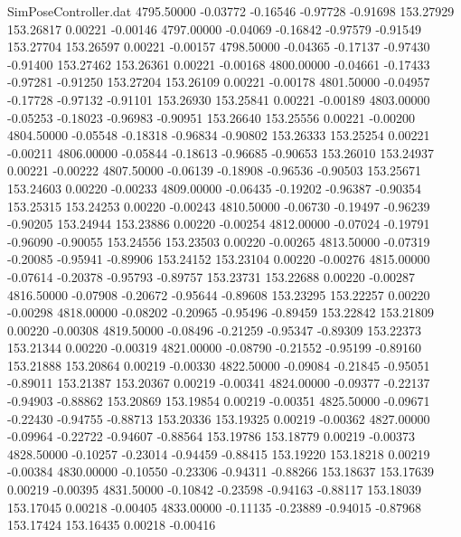 \begin{filecontents}{SimPoseController.dat}
4795.50000   -0.03772   -0.16546    -0.97728   -0.91698  153.27929  153.26817    0.00221   -0.00146
4797.00000   -0.04069   -0.16842    -0.97579   -0.91549  153.27704  153.26597    0.00221   -0.00157
4798.50000   -0.04365   -0.17137    -0.97430   -0.91400  153.27462  153.26361    0.00221   -0.00168
4800.00000   -0.04661   -0.17433    -0.97281   -0.91250  153.27204  153.26109    0.00221   -0.00178
4801.50000   -0.04957   -0.17728    -0.97132   -0.91101  153.26930  153.25841    0.00221   -0.00189
4803.00000   -0.05253   -0.18023    -0.96983   -0.90951  153.26640  153.25556    0.00221   -0.00200
4804.50000   -0.05548   -0.18318    -0.96834   -0.90802  153.26333  153.25254    0.00221   -0.00211
4806.00000   -0.05844   -0.18613    -0.96685   -0.90653  153.26010  153.24937    0.00221   -0.00222
4807.50000   -0.06139   -0.18908    -0.96536   -0.90503  153.25671  153.24603    0.00220   -0.00233
4809.00000   -0.06435   -0.19202    -0.96387   -0.90354  153.25315  153.24253    0.00220   -0.00243
4810.50000   -0.06730   -0.19497    -0.96239   -0.90205  153.24944  153.23886    0.00220   -0.00254
4812.00000   -0.07024   -0.19791    -0.96090   -0.90055  153.24556  153.23503    0.00220   -0.00265
4813.50000   -0.07319   -0.20085    -0.95941   -0.89906  153.24152  153.23104    0.00220   -0.00276
4815.00000   -0.07614   -0.20378    -0.95793   -0.89757  153.23731  153.22688    0.00220   -0.00287
4816.50000   -0.07908   -0.20672    -0.95644   -0.89608  153.23295  153.22257    0.00220   -0.00298
4818.00000   -0.08202   -0.20965    -0.95496   -0.89459  153.22842  153.21809    0.00220   -0.00308
4819.50000   -0.08496   -0.21259    -0.95347   -0.89309  153.22373  153.21344    0.00220   -0.00319
4821.00000   -0.08790   -0.21552    -0.95199   -0.89160  153.21888  153.20864    0.00219   -0.00330
4822.50000   -0.09084   -0.21845    -0.95051   -0.89011  153.21387  153.20367    0.00219   -0.00341
4824.00000   -0.09377   -0.22137    -0.94903   -0.88862  153.20869  153.19854    0.00219   -0.00351
4825.50000   -0.09671   -0.22430    -0.94755   -0.88713  153.20336  153.19325    0.00219   -0.00362
4827.00000   -0.09964   -0.22722    -0.94607   -0.88564  153.19786  153.18779    0.00219   -0.00373
4828.50000   -0.10257   -0.23014    -0.94459   -0.88415  153.19220  153.18218    0.00219   -0.00384
4830.00000   -0.10550   -0.23306    -0.94311   -0.88266  153.18637  153.17639    0.00219   -0.00395
4831.50000   -0.10842   -0.23598    -0.94163   -0.88117  153.18039  153.17045    0.00218   -0.00405
4833.00000   -0.11135   -0.23889    -0.94015   -0.87968  153.17424  153.16435    0.00218   -0.00416

\end{filecontents}
